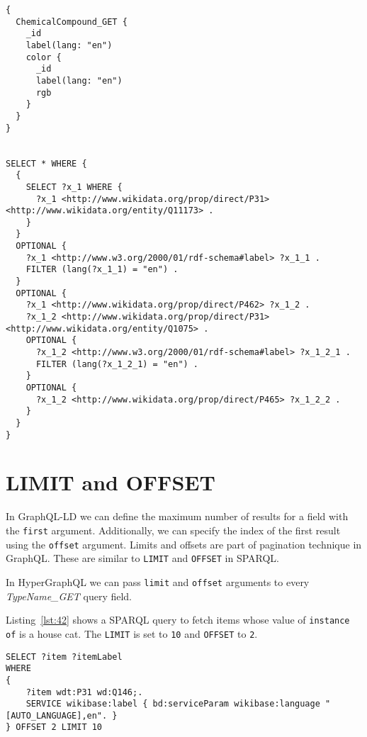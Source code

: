 \begin{minipage}{\linewidth}
\begin{lstlisting}[columns=fullflexible, label=lst:41, caption={GraphQL query and generated SPARQL query in HyperGraphQL}, language=SPARQL]
{
  ChemicalCompound_GET {
    _id
    label(lang: "en")
    color {
      _id
      label(lang: "en")
      rgb
    }
  }
}


SELECT * WHERE { 
  { 
    SELECT ?x_1 WHERE { 
      ?x_1 <http://www.wikidata.org/prop/direct/P31> <http://www.wikidata.org/entity/Q11173> . 
    }  
  }  
  OPTIONAL { 
    ?x_1 <http://www.w3.org/2000/01/rdf-schema#label> ?x_1_1 .
    FILTER (lang(?x_1_1) = "en") .  
  }  
  OPTIONAL { 
    ?x_1 <http://www.wikidata.org/prop/direct/P462> ?x_1_2 .
    ?x_1_2 <http://www.wikidata.org/prop/direct/P31> <http://www.wikidata.org/entity/Q1075> . 
    OPTIONAL { 
      ?x_1_2 <http://www.w3.org/2000/01/rdf-schema#label> ?x_1_2_1 .
      FILTER (lang(?x_1_2_1) = "en") .  
    }  
    OPTIONAL { 
      ?x_1_2 <http://www.wikidata.org/prop/direct/P465> ?x_1_2_2 . 
    }  
  }  
}
\end{lstlisting}
\end{minipage}


\section{LIMIT and OFFSET}

In GraphQL-LD we can define the maximum number of results for a field with the \texttt{first} argument. Additionally, we can specify the index of the first result using the \texttt{offset} argument. Limits and offsets are part of pagination technique in GraphQL. These are similar to \texttt{LIMIT} and \texttt{OFFSET} in SPARQL.

In HyperGraphQL we can pass \texttt{limit} and \texttt{offset} arguments to every \textit{TypeName\_GET} query field.

Listing~\ref{lst:42} shows a SPARQL query to fetch items whose value of \texttt{instance of} is a house cat. The \texttt{LIMIT} is set to \texttt{10} and \texttt{OFFSET} to \texttt{2}.


\begin{minipage}{\linewidth}
\begin{lstlisting}[label=lst:42, caption={SPARQL query showing usage of LIMIT and OFFSET}, language=SPARQL]
SELECT ?item ?itemLabel
WHERE
{
    ?item wdt:P31 wd:Q146;.
    SERVICE wikibase:label { bd:serviceParam wikibase:language "[AUTO_LANGUAGE],en". }
} OFFSET 2 LIMIT 10
\end{lstlisting}
\end{minipage}

